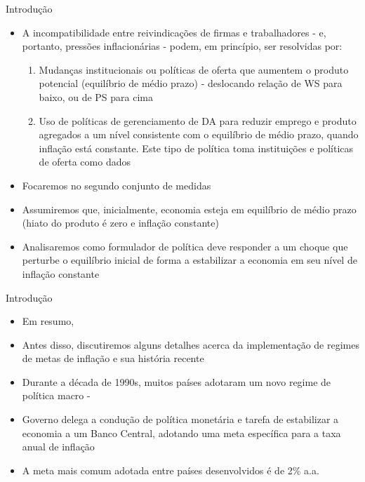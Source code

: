 \documentclass[10pt]{beamer}
\begin{document}
\begin{frame}
    {Introdução}
    \begin{itemize}
        \item A incompatibilidade entre reivindicações de firmas e trabalhadores - e, portanto, pressões inflacionárias - podem, em princípio, ser resolvidas por:\medskip
        \begin{enumerate}
            \item Mudanças institucionais ou políticas de oferta que aumentem o produto potencial (equilíbrio de médio prazo) - deslocando relação de WS para baixo, ou de PS para cima\medskip
            \item Uso de políticas de gerenciamento de DA para reduzir emprego e produto agregados a um nível consistente com o equilíbrio de médio prazo, quando inflação está constante. Este tipo de política toma instituições e políticas de oferta como dados\medskip
        \end{enumerate}
        \item Focaremos no segundo conjunto de medidas\bigskip
        \item Assumiremos que, inicialmente, economia esteja em equilíbrio de médio prazo (hiato do produto é zero e inflação constante)\bigskip
        \item Analisaremos como formulador de política deve responder a um choque que perturbe o equilíbrio inicial de forma a estabilizar a economia em seu nível de inflação constante
    \end{itemize}
\end{frame}

\begin{frame}
    {Introdução}
    \begin{itemize}
        \item Em resumo, \bigskip
        \item Antes disso, discutiremos alguns detalhes acerca da implementação de regimes de metas de inflação e sua história recente\bigskip
        \item Durante a década de 1990s, muitos países adotaram um novo regime de política macro - \bigskip
        \item Governo delega a condução de política monetária e tarefa de estabilizar a economia a um Banco Central, adotando uma meta específica para a taxa anual de inflação\bigskip
        \item A meta mais comum adotada entre países desenvolvidos é de 2\% a.a.
    \end{itemize}
\end{frame}
\end{document}
